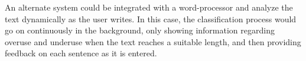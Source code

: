 \documentclass[main.tex]{subfiles}
\begin{document}
An alternate system could be integrated with a word-processor and analyze the text dynamically as the user writes. In this case, the classification process would go on continuously in the background, only showing information regarding overuse and underuse when the text reaches a suitable length, and then providing feedback on each sentence as it is entered.

\biblio
\end{document}
